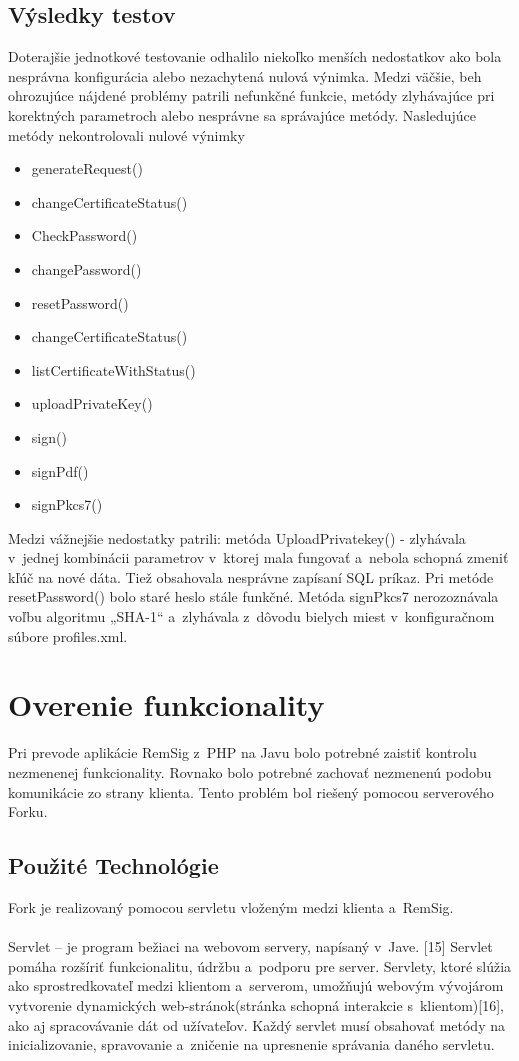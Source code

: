 \documentclass[
  digital, %
  table,   %
oneside,
  nolof,     %
  nolot,     %
]{fithesis3}
\begin{document}
\subsection{Výsledky testov}
Doterajšie jednotkové testovanie odhalilo niekoľko menších nedostatkov ako bola nesprávna konfigurácia alebo nezachytená nulová výnimka. Medzi väčšie, beh ohrozujúce nájdené problémy patrili nefunkčné funkcie, metódy zlyhávajúce pri korektných parametroch alebo nesprávne sa správajúce metódy.  
Nasledujúce metódy nekontrolovali nulové výnimky 

\begin{itemize}

\item generateRequest()
\item changeCertificateStatus()
\item CheckPassword()
\item changePassword()
\item resetPassword()
\item changeCertificateStatus()
\item listCertificateWithStatus()
\item uploadPrivateKey()
\item sign()
\item signPdf()
\item signPkcs7()
 \end{itemize}


Medzi vážnejšie nedostatky patrili: metóda UploadPrivatekey() - zlyhávala v~jednej kombinácii parametrov v~ktorej mala fungovať a~nebola schopná zmeniť kľúč na nové dáta. Tiež obsahovala nesprávne zapísaní SQL príkaz. Pri metóde resetPassword() bolo staré heslo stále funkčné. Metóda signPkcs7 nerozoznávala voľbu algoritmu „SHA-1“ a~zlyhávala z~dôvodu bielych miest v~konfiguračnom súbore profiles.xml. 



\section{Overenie funkcionality}
Pri prevode aplikácie RemSig z~PHP na Javu bolo potrebné zaistiť kontrolu nezmenenej funkcionality.   Rovnako bolo potrebné zachovať nezmenenú podobu komunikácie zo strany klienta.  Tento problém bol riešený pomocou serverového Forku.
\subsection{Použité Technológie}
Fork je realizovaný pomocou servletu vloženým medzi klienta a~RemSig.\paragraph{}
Servlet – je program bežiaci na webovom servery, napísaný v~Jave. [15]  Servlet pomáha rozšíriť  funkcionalitu, údržbu a~podporu pre server. Servlety, ktoré slúžia ako sprostredkovateľ medzi klientom a~serverom,  umožňujú webovým vývojárom vytvorenie dynamických web-stránok(stránka schopná interakcie s~klientom)[16], ako aj spracovávanie dát od užívateľov. Každý servlet musí obsahovať metódy na inicializovanie, spravovanie a~zničenie na upresnenie správania daného servletu.
\end{document}
